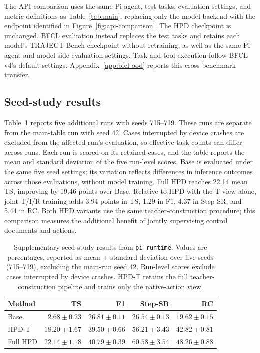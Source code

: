 \documentclass{article}
\begin{document}
The API comparison uses the same Pi agent, test tasks, evaluation settings,
and metric definitions as Table~\ref{tab:main}, replacing only the model
backend with the endpoint identified in Figure~\ref{fig:api-comparison}.
The HPD checkpoint is unchanged. BFCL evaluation instead replaces the test
tasks and retains each model's TRAJECT-Bench checkpoint without retraining,
as well as the same Pi agent and model-side evaluation settings. Task and
tool execution follow BFCL v4's default settings. Appendix~\ref{app:bfcl-ood}
reports this cross-benchmark transfer.

\subsection{Seed-study results}
\label{app:statistical-reporting}

Table~\ref{tab:seed-robustness} reports five additional runs with seeds
715--719. These runs are separate from the main-table run
with seed 42. Cases interrupted by device crashes are excluded from the affected run's
evaluation, so effective task counts can differ across runs. Each run is
scored on its retained cases, and the table reports the mean and standard
deviation of the five run-level scores. Base is evaluated under the same
five seed settings; its variation reflects differences in inference outcomes
across those evaluations, without model training.
Full HPD reaches 22.14 mean TS, improving by 19.46 points over Base. Relative
to HPD with the T view alone, joint T/I/R training adds 3.94 points in TS,
1.29 in F1, 4.37 in Step-SR, and 5.44 in RC. Both HPD variants use the same
teacher-construction procedure; this comparison measures the additional
benefit of jointly supervising control documents and actions.

\begin{table}[!htbp]
\centering
\small
\setlength{\tabcolsep}{4pt}
\caption{Supplementary seed-study results from \texttt{pi-runtime}.
Values are percentages, reported as mean $\pm$ standard deviation over
five seeds (715--719), excluding the main-run seed 42. Run-level scores
exclude cases interrupted by device crashes. HPD-T retains
the full teacher-construction pipeline and trains only the native-action view.}
\label{tab:seed-robustness}
\begin{tabular}{@{}lrrrr@{}}
\toprule
Method & TS & F1 & Step-SR & RC \\
\midrule
Base & $2.68 \pm 0.23$ & $26.81 \pm 0.11$ & $26.54 \pm 0.13$ & $19.62 \pm 0.15$ \\
HPD-T & $18.20 \pm 1.67$ & $39.50 \pm 0.66$ & $56.21 \pm 3.43$ & $42.82 \pm 0.81$ \\
Full HPD & $\mathbf{22.14 \pm 1.18}$ & $\mathbf{40.79 \pm 0.39}$ & $\mathbf{60.58 \pm 3.54}$ & $\mathbf{48.26 \pm 0.88}$ \\
\bottomrule
\end{tabular}
\end{table}
\end{document}
